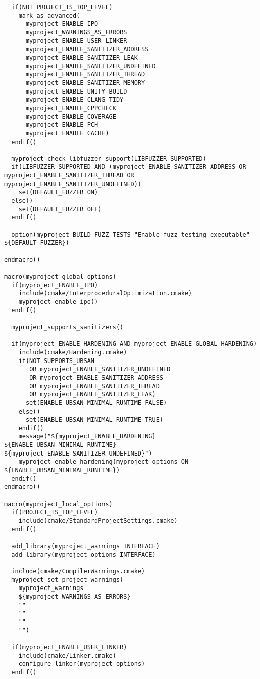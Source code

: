 \begin{verbatim}
  if(NOT PROJECT_IS_TOP_LEVEL)
    mark_as_advanced(
      myproject_ENABLE_IPO
      myproject_WARNINGS_AS_ERRORS
      myproject_ENABLE_USER_LINKER
      myproject_ENABLE_SANITIZER_ADDRESS
      myproject_ENABLE_SANITIZER_LEAK
      myproject_ENABLE_SANITIZER_UNDEFINED
      myproject_ENABLE_SANITIZER_THREAD
      myproject_ENABLE_SANITIZER_MEMORY
      myproject_ENABLE_UNITY_BUILD
      myproject_ENABLE_CLANG_TIDY
      myproject_ENABLE_CPPCHECK
      myproject_ENABLE_COVERAGE
      myproject_ENABLE_PCH
      myproject_ENABLE_CACHE)
  endif()

  myproject_check_libfuzzer_support(LIBFUZZER_SUPPORTED)
  if(LIBFUZZER_SUPPORTED AND (myproject_ENABLE_SANITIZER_ADDRESS OR myproject_ENABLE_SANITIZER_THREAD OR myproject_ENABLE_SANITIZER_UNDEFINED))
    set(DEFAULT_FUZZER ON)
  else()
    set(DEFAULT_FUZZER OFF)
  endif()

  option(myproject_BUILD_FUZZ_TESTS "Enable fuzz testing executable" ${DEFAULT_FUZZER})

endmacro()

macro(myproject_global_options)
  if(myproject_ENABLE_IPO)
    include(cmake/InterproceduralOptimization.cmake)
    myproject_enable_ipo()
  endif()

  myproject_supports_sanitizers()

  if(myproject_ENABLE_HARDENING AND myproject_ENABLE_GLOBAL_HARDENING)
    include(cmake/Hardening.cmake)
    if(NOT SUPPORTS_UBSAN 
       OR myproject_ENABLE_SANITIZER_UNDEFINED
       OR myproject_ENABLE_SANITIZER_ADDRESS
       OR myproject_ENABLE_SANITIZER_THREAD
       OR myproject_ENABLE_SANITIZER_LEAK)
      set(ENABLE_UBSAN_MINIMAL_RUNTIME FALSE)
    else()
      set(ENABLE_UBSAN_MINIMAL_RUNTIME TRUE)
    endif()
    message("${myproject_ENABLE_HARDENING} ${ENABLE_UBSAN_MINIMAL_RUNTIME} ${myproject_ENABLE_SANITIZER_UNDEFINED}")
    myproject_enable_hardening(myproject_options ON ${ENABLE_UBSAN_MINIMAL_RUNTIME})
  endif()
endmacro()

macro(myproject_local_options)
  if(PROJECT_IS_TOP_LEVEL)
    include(cmake/StandardProjectSettings.cmake)
  endif()

  add_library(myproject_warnings INTERFACE)
  add_library(myproject_options INTERFACE)

  include(cmake/CompilerWarnings.cmake)
  myproject_set_project_warnings(
    myproject_warnings
    ${myproject_WARNINGS_AS_ERRORS}
    ""
    ""
    ""
    "")

  if(myproject_ENABLE_USER_LINKER)
    include(cmake/Linker.cmake)
    configure_linker(myproject_options)
  endif()


\end{verbatim}
